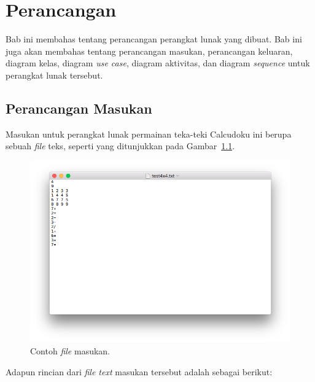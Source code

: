 \chapter{Perancangan}
\label{chap:perancangan}

Bab ini membahas tentang perancangan perangkat lunak yang dibuat. Bab ini juga akan membahas tentang perancangan masukan, perancangan keluaran, diagram kelas, diagram \textit{use case}, diagram aktivitas, dan diagram \textit{sequence} untuk perangkat lunak tersebut.

\section{Perancangan Masukan}
\label{sec:perancanganmasukan}

Masukan untuk perangkat lunak permainan teka-teki Calcudoku ini berupa sebuah \textit{file} teks, seperti yang ditunjukkan pada Gambar~\ref{fig:perancanganmasukan}.

\begin{figure}
\centering
\captionsetup{justification=centering}
\includegraphics[scale=0.5]{Gambar/Perancangan/PerancanganInput.png}
\caption[Contoh \textit{file} masukan.]{Contoh \textit{file} masukan.}
\label{fig:perancanganmasukan}
\end{figure}

Adapun rincian dari \textit{file text} masukan tersebut adalah sebagai berikut:

